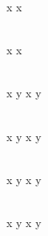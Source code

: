 \left\lfloor x \right\rfloor \le x

\\

x \le \left\lceil x \right\rceil

\\

\left\lfloor x \right\rfloor \gt y \Rightarrow x \gt  y

\\

\left\lceil x \right\rceil \lt y \Rightarrow x \lt y

\\

\left\lfloor x \right\rfloor \lt y \Rightarrow x \lt \left\lceil y \right\rceil

\\

\left\lceil x \right\rceil \gt y \Rightarrow x \gt \left\lfloor y \right\rfloor
